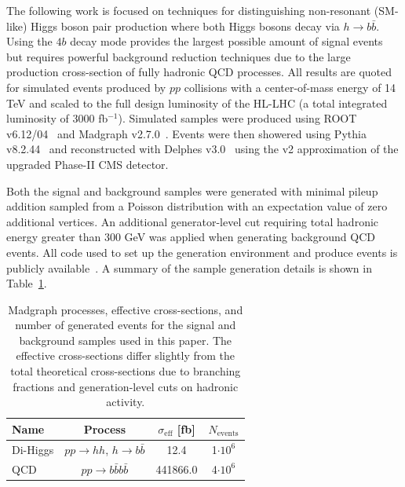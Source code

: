 The following work is focused on techniques for distinguishing non-resonant (SM-like) Higgs boson pair production where both Higgs bosons decay via $h \to b \bar{b}$. Using the $4b$ decay mode provides the largest possible amount of signal events but requires powerful background reduction techniques due to the large production cross-section of fully hadronic QCD processes. All results are quoted for simulated events produced by $pp$ collisions with a center-of-mass energy of 14 TeV and scaled to the full design luminosity of the HL-LHC (a total integrated luminosity of 3000 fb$^{-1}$). Simulated samples were produced using ROOT v6.12/04~\cite{Brun:1997pa} and Madgraph v2.7.0~\cite{Alwall:2014hca}. Events were then showered using Pythia v8.2.44~\cite{Sj_strand_2015} and reconstructed with Delphes v3.0~\cite{de_Favereau_2014} using the v2 approximation of the upgraded Phase-II CMS detector.

Both the signal and background samples were generated with minimal pileup addition sampled from a Poisson distribution with an expectation value of zero additional vertices. An additional generator-level cut requiring total hadronic energy greater than 300 GeV was applied when generating background QCD events. All code used to set up the generation environment and produce events is publicly available~\cite{github}. A summary of the sample generation details is shown in Table~\ref{tab:samples}.

\begin{table}[ht!]
 \label{tab:samples}
\centering
    \begin{tabular}{|l|c|c|c|} %
      \hline\hline
      Name & Process & $\sigma_{\textrm{eff}}$ [fb] & $N_{\textrm{events}}$ \\
      \hline
      Di-Higgs & $p p \rightarrow h h$, $h \rightarrow b \bar{b}$ & 12.4 & 1$\cdot 10^6$ \\
      QCD     & $p p \rightarrow b \bar{b} b \bar{b}$ & 441866.0 & 4$\cdot 10^6$ \\
      \hline\hline
    \end{tabular}
\caption{Madgraph processes, effective cross-sections, and number of generated events for the signal and background samples used in this paper. The effective cross-sections differ slightly from the total theoretical cross-sections due to branching fractions and generation-level cuts on hadronic activity.}
\end{table}

